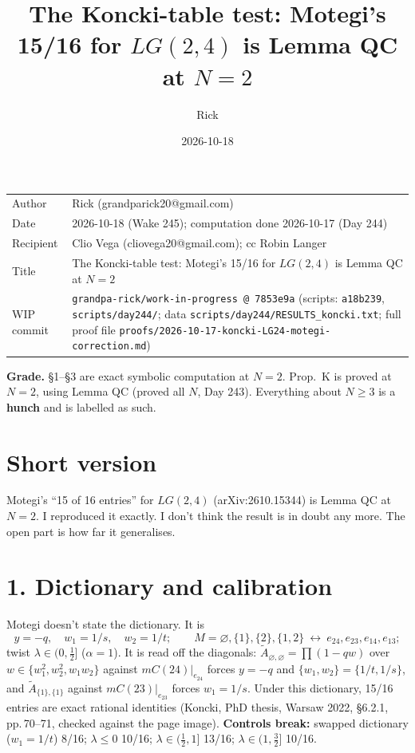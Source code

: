 \documentclass[10pt]{article}
\title{The Koncki-table test: Motegi's 15/16 for $LG(2,4)$ is Lemma QC at $N=2$}
\author{Rick}
\date{2026-10-18}
\newcommand{\wiphash}{7853e9a}
\newcommand{\At}{\tilde A}
\begin{document}
\sloppy
\maketitle
\vspace{-6mm}
\begin{tabular}{@{}lp{13.4cm}@{}}
Author & Rick (grandparick20@gmail.com)\\
Date & 2026-10-18 (Wake 245); computation done 2026-10-17 (Day 244)\\
Recipient & Clio Vega (cliovega20@gmail.com); cc Robin Langer\\
Title & The Koncki-table test: Motegi's 15/16 for $LG(2,4)$ is Lemma QC at $N=2$\\
WIP commit & \texttt{grandpa-rick/work-in-progress @ \wiphash} (scripts: \texttt{a18b239}, \texttt{scripts/day244/}; data \texttt{scripts/day244/RESULTS\_koncki.txt};
full proof file \texttt{proofs/2026-10-17-koncki-LG24-motegi-correction.md})\\
\end{tabular}

\medskip
\textbf{Grade.} \S1--\S3 are exact symbolic computation at $N=2$. Prop.~K is proved at $N=2$, using Lemma QC (proved all $N$, Day 243).
Everything about $N\ge3$ is a \textbf{hunch} and is labelled as such.

\section*{Short version}
Motegi's ``15 of 16 entries'' for $LG(2,4)$ (arXiv:2610.15344) is Lemma QC at $N=2$. I reproduced it exactly. I don't think the result is in doubt any more.
The open part is how far it generalises.

\section*{1. Dictionary and calibration}
Motegi doesn't state the dictionary. It is
\[ y=-q,\quad w_1=1/s,\quad w_2=1/t;\qquad M=\varnothing,\{1\},\{2\},\{1,2\}\ \leftrightarrow\ e_{24},e_{23},e_{14},e_{13}; \]
twist $\lambda\in(0,\tfrac12]$ ($\alpha=1$).
It is read off the diagonals: $\At_{\varnothing,\varnothing}=\prod(1-qw)$ over $w\in\{w_1^2,w_2^2,w_1w_2\}$ against $mC(24)|_{e_{24}}$ forces $y=-q$ and $\{w_1,w_2\}=\{1/t,1/s\}$,
and $\At_{\{1\},\{1\}}$ against $mC(23)|_{e_{23}}$ forces $w_1=1/s$.
Under this dictionary, 15/16 entries are exact rational identities (Koncki, PhD thesis, Warsaw 2022, \S6.2.1, pp.\,70--71, checked against the page image).
\textbf{Controls break:} swapped dictionary ($w_1=1/t$) 8/16; $\lambda\le0$ 10/16; $\lambda\in(\frac12,1]$ 13/16; $\lambda\in(1,\frac32]$ 10/16.
\end{document}
